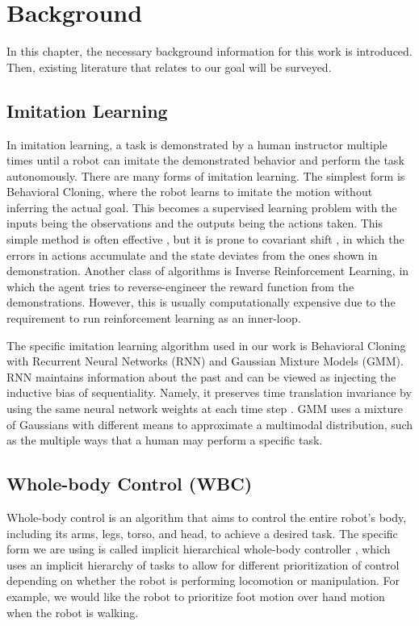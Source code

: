 \chapter{Background}

In this chapter, the necessary background information for this work is introduced. Then, existing literature that relates to our goal will be surveyed.

\section{Imitation Learning}

In imitation learning, a task is demonstrated by a human instructor multiple times until a robot can imitate the demonstrated behavior and perform the task autonomously. 
There are many forms of imitation learning.
The simplest form is Behavioral Cloning, where the robot learns to imitate the motion without inferring the actual goal. This becomes a supervised learning problem with the inputs being the observations and the outputs being the actions taken. This simple method is often effective \cite{zhang2018deep}, but it is prone to covariant shift \cite{ross2011reduction}, in which the errors in actions accumulate and the state deviates from the ones shown in demonstration. 
Another class of algorithms is Inverse Reinforcement Learning, in which the agent tries to reverse-engineer the reward function from the demonstrations. 
However, this is usually computationally expensive due to the requirement to run reinforcement learning as an inner-loop.

The specific imitation learning algorithm used in our work is Behavioral Cloning with Recurrent Neural Networks (RNN) and Gaussian Mixture Models (GMM). RNN maintains information about the past and can be viewed as injecting the inductive bias of sequentiality. Namely, it preserves time translation invariance by using the same neural network weights at each time step \cite{battaglia2018relational}. GMM uses a mixture of Gaussians with different means to approximate a multimodal distribution, such as the multiple ways that a human may perform a specific task.

\section{Whole-body Control (WBC)}

Whole-body control is an algorithm that aims to control the entire robot's body, including its arms, legs, torso, and head, to achieve a desired task.
The specific form we are using is called implicit hierarchical whole-body controller \cite{Ahn2021VersatileLP}, which uses an implicit hierarchy of tasks to allow for different prioritization of control depending on whether the robot is performing locomotion or manipulation. For example, we would like the robot to prioritize foot motion over hand motion when the robot is walking.

